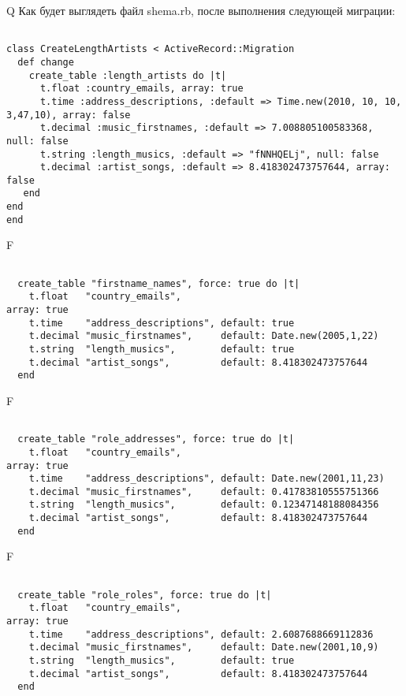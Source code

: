 Q
Как будет выглядеть файл shema.rb, после выполнения следующей миграции:

\begin{verbatim}

class CreateLengthArtists < ActiveRecord::Migration 
  def change 
    create_table :length_artists do |t| 
      t.float :country_emails, array: true
      t.time :address_descriptions, :default => Time.new(2010, 10, 10, 3,47,10), array: false
      t.decimal :music_firstnames, :default => 7.008805100583368, null: false
      t.string :length_musics, :default => "fNNHQELj", null: false
      t.decimal :artist_songs, :default => 8.418302473757644, array: false
   end
end
end
\end{verbatim}

F
\begin{verbatim}

  create_table "firstname_names", force: true do |t|
    t.float   "country_emails",                                                    array: true
    t.time    "address_descriptions", default: true
    t.decimal "music_firstnames",     default: Date.new(2005,1,22)
    t.string  "length_musics",        default: true
    t.decimal "artist_songs",         default: 8.418302473757644
  end

\end{verbatim}

F
\begin{verbatim}

  create_table "role_addresses", force: true do |t|
    t.float   "country_emails",                                                    array: true
    t.time    "address_descriptions", default: Date.new(2001,11,23)
    t.decimal "music_firstnames",     default: 0.41783810555751366
    t.string  "length_musics",        default: 0.12347148188084356
    t.decimal "artist_songs",         default: 8.418302473757644
  end

\end{verbatim}

F
\begin{verbatim}

  create_table "role_roles", force: true do |t|
    t.float   "country_emails",                                                    array: true
    t.time    "address_descriptions", default: 2.6087688669112836
    t.decimal "music_firstnames",     default: Date.new(2001,10,9)
    t.string  "length_musics",        default: true
    t.decimal "artist_songs",         default: 8.418302473757644
  end

\end{verbatim}

